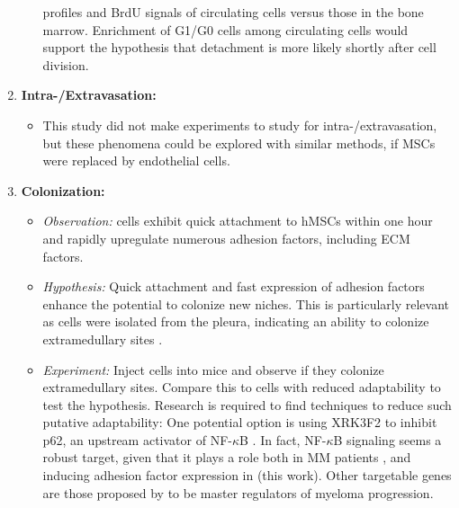 \begin{enumerate}
\begin{itemize}
                    profiles and BrdU signals of circulating cells versus
                    those in the bone marrow. Enrichment of G1/G0 cells
                    among circulating cells would support the hypothesis
                    that detachment is more likely shortly after cell
                    division.
          \end{itemize}
    \item \textbf{Intra-/Extravasation:}
          \begin{itemize}
              \item This study did not make experiments to study for
                    intra-/extravasation, but these phenomena could be
                    explored with similar methods, if MSCs were replaced by
                    endothelial cells.
          \end{itemize}
    \item \textbf{Colonization:}
          \begin{itemize}
              \item \textit{Observation:} \INA cells exhibit quick
                    attachment to \acp{hMSC} within one hour and rapidly
                    upregulate numerous adhesion factors, including \ac{ECM}
                    factors.
              \item \textit{Hypothesis:} Quick attachment and fast
                    expression of adhesion factors enhance the potential to
                    colonize new niches. This is particularly relevant as \INA
                    cells were isolated from the pleura, indicating an ability to
                    colonize extramedullary sites
                    \cite{burgerGp130RasMediated2001c}.
              \item \textit{Experiment:} Inject \INA cells into mice and
                    observe if they colonize extramedullary sites. Compare
                    this to \INA cells with reduced adaptability to test the
                    hypothesis. Research is required to find techniques to
                    reduce such putative adaptability: One potential option
                    is using XRK3F2 to inhibit p62, an upstream activator of
                    NF-$\kappa$B \cite{adamikXRK3F2InhibitionP62ZZ2018}. In
                    fact, NF-$\kappa$B signaling seems a robust target,
                    given that it plays a role both in MM patients
                    \cite{sarinEvaluatingEfficacyMultiple2020}, and inducing
                    adhesion factor expression in \INA (this work). Other
                    targetable genes are those proposed by
                    \citet{shenProgressionSignatureUnderlies2021} to be
                    master regulators of myeloma progression.
          \end{itemize}
\end{enumerate}


